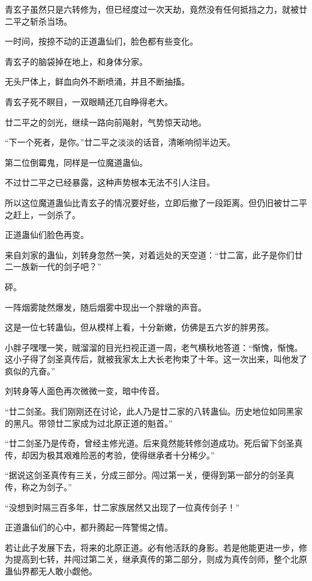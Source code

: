 
\begin{this_body}

青玄子虽然只是六转修为，但已经度过一次天劫，竟然没有任何抵挡之力，就被廿二平之斩杀当场。

一时间，按捺不动的正道蛊仙们，脸色都有些变化。

青玄子的脑袋掉在地上，和身体分家。

无头尸体上，鲜血向外不断喷涌，并且不断抽搐。

青玄子死不瞑目，一双眼睛还兀自睁得老大。

廿二平之的剑光，继续一路向前飚射，气势惊天动地。

“下一个死者，是你。”廿二平之淡淡的话音，清晰响彻半边天。

第二位倒霉鬼，同样是一位魔道蛊仙。

不过廿二平之已经暴露，这种声势根本无法不引人注目。

所以这位魔道蛊仙比青玄子的情况要好些，立即后撤了一段距离。但仍旧被廿二平之赶上，一剑杀了。

正道蛊仙们脸色再变。

来自刘家的蛊仙，刘转身忽然一笑，对着远处的天空道：“廿二富，此子是你们廿二一族新一代的剑子吧？”

砰。

一阵烟雾陡然爆发，随后烟雾中现出一个胖墩的声音。

这是一位七转蛊仙，但从模样上看，十分新嫩，仿佛是五六岁的胖男孩。

小胖子嘿嘿一笑，贼溜溜的目光扫视正道一周，老气横秋地答道：“惭愧，惭愧。这小子得了剑圣真传后，就被我家太上大长老拘束了十年。这一次出来，叫他发了疯似的亢奋。”

刘转身等人面色再次微微一变，暗中传音。

“廿二剑圣。我们刚刚还在讨论，此人乃是廿二家的八转蛊仙。历史地位如同黑家的黑凡。带领廿二家成为过北原正道的魁首。”

“廿二剑圣乃是传奇，曾经主修光道。后来竟然能转修剑道成功。死后留下剑圣真传，却因为极其艰难险恶的考验，使得继承者十分稀少。”

“据说这剑圣真传有三关，分成三部分。闯过第一关，便得到第一部分的剑圣真传，称之为剑子。”

“没想到时隔三百多年，廿二家族居然又出现了一位真传剑子！”

正道蛊仙们的心中，都升腾起一阵警惕之情。

若让此子发展下去，将来的北原正道。必有他活跃的身影。若是他能更进一步，修为提高到七转，并闯过第二关，继承真传的第二部分，则成为真传剑师，整个北原蛊仙界都无人敢小觑他。


\end{this_body}
